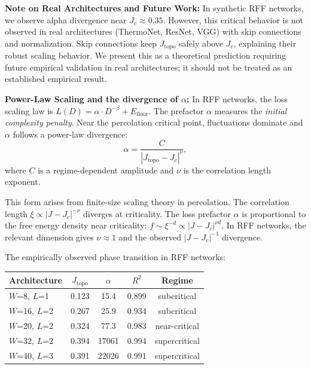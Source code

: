 \documentclass[11pt, a4paper]{article}
\theoremstyle{plain}
\begin{document}
\medskip\noindent\textbf{Note on Real Architectures and Future Work:} In synthetic RFF networks, we observe alpha divergence near $J_c \approx 0.35$. However, this critical behavior is not observed in real architectures (ThermoNet, ResNet, VGG) with skip connections and normalization. Skip connections keep $J_{\mathrm{topo}}$ safely above $J_c$, explaining their robust scaling behavior. We present this as a theoretical prediction requiring future empirical validation in real architectures; it should not be treated as an established empirical result.

\medskip\noindent\textbf{Power-Law Scaling and the divergence of $\alpha$:} In RFF networks, the loss scaling law is $L(D) = \alpha \cdot D^{-\beta} + E_{\mathrm{floor}}$. The prefactor $\alpha$ measures the \emph{initial complexity penalty}. Near the percolation critical point, fluctuations dominate and $\alpha$ follows a power-law divergence:
\begin{equation}
\alpha = \frac{C}{|J_{\mathrm{topo}} - J_c|^{\nu}},
\end{equation}
where $C$ is a regime-dependent amplitude and $\nu$ is the correlation length exponent.

This form arises from finite-size scaling theory in percolation. The correlation length $\xi \propto |J - J_c|^{-\nu}$ diverges at criticality. The loss prefactor $\alpha$ is proportional to the free energy density near criticality: $f \sim \xi^{-d} \propto |J - J_c|^{\nu d}$. In RFF networks, the relevant dimension gives $\nu \approx 1$ and the observed $|J - J_c|^{-1}$ divergence.

The empirically observed phase transition in RFF networks:
\begin{center}
\begin{tabular}{lcccc}
\toprule
Architecture & $J_{\mathrm{topo}}$ & $\alpha$ & $R^2$ & Regime \\
\midrule
$W$=8, $L$=1 & 0.123 & 15.4 & 0.899 & subcritical \\
$W$=16, $L$=2 & 0.267 & 25.9 & 0.934 & subcritical \\
$W$=20, $L$=2 & 0.324 & 77.3 & 0.983 & near-critical \\
$W$=32, $L$=2 & 0.394 & 17061 & 0.994 & supercritical \\
$W$=40, $L$=3 & 0.391 & 22026 & 0.991 & supercritical \\
\bottomrule
\end{tabular}
\end{center}
\end{document}
